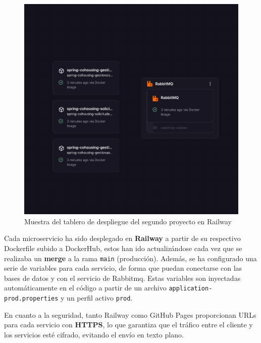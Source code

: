 \begin{figure}[H]
  \centering
  \includegraphics[width=1\textwidth]{fotos/railway2.png}
  \caption{Muestra del tablero de despliegue del segundo proyecto en Railway}
  \label{fig:railway2}
\end{figure}
Cada microservicio ha sido desplegado en \textbf{Railway} a partir de su respectivo Dockerfile subido a DockerHub, estos han ido actualizándose cada vez que se realizaba un \textbf{merge} a la rama \texttt{main} (producción). Además, se ha configurado una serie de variables para cada servicio, de forma que puedan conectarse con las bases de datos y con el servicio de Rabbitmq. Estas variables son inyectadas automáticamente en el código a partir de un archivo \texttt{application-prod.properties} y un perfil activo \texttt{prod}.

En cuanto a la seguridad, tanto Railway como GitHub Pages proporcionan URLs para cada servicio con \textbf{HTTPS}, lo que garantiza que el tráfico entre el cliente y los servicios esté cifrado, evitando el envío en texto plano.

